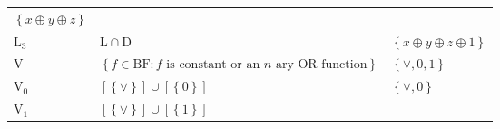 \documentclass[10pt,a4paper]{article}
\newcommand{\set}[1]{\left\{#1\right\}}
\newcommand{\xor}{\oplus}
\newcommand{\clonefont}[1]{\mathrm{#1}}
\begin{document}
\begin{figure}[hbtp]
\begin{small}
\begin{longtable}[]{p{}p{}p{}}
\begin{minipage}[t]{0.38\columnwidth}
                \(\set{x \xor y \xor z}\)\strut
            \end{minipage}\tabularnewline
            \begin{minipage}[t]{0.12\columnwidth}\raggedright
                \(\clonefont{L_3}\)\strut
            \end{minipage} & \begin{minipage}[t]{0.41\columnwidth}\raggedright
                \(\clonefont{L} \cap \clonefont{D}\)\strut
            \end{minipage} & \begin{minipage}[t]{0.38\columnwidth}\raggedright
                \(\set{x \xor y \xor z \xor 1}\)\strut
            \end{minipage}\tabularnewline
            \begin{minipage}[t]{0.12\columnwidth}\raggedright
                \(\clonefont{V}\)\strut
            \end{minipage} & \begin{minipage}[t]{0.41\columnwidth}\raggedright
                \(\set{f \in \clonefont{BF} : f \text{ is constant or an $n$-ary OR function}}\)\strut
            \end{minipage} & \begin{minipage}[t]{0.38\columnwidth}\raggedright
                \(\set{\lor,0,1}\)\strut
            \end{minipage}\tabularnewline
            \begin{minipage}[t]{0.12\columnwidth}\raggedright
                \(\clonefont{V_0}\)\strut
            \end{minipage} & \begin{minipage}[t]{0.41\columnwidth}\raggedright
                \([\set{\lor}] \cup [\set{0}]\)\strut
            \end{minipage} & \begin{minipage}[t]{0.38\columnwidth}\raggedright
                \(\set{\lor,0}\)\strut
            \end{minipage}\tabularnewline
            \begin{minipage}[t]{0.12\columnwidth}\raggedright
                \(\clonefont{V_1}\)\strut
            \end{minipage} & \begin{minipage}[t]{0.41\columnwidth}\raggedright
                \([\set{\lor}] \cup [\set{1}]\)\strut
            \end{minipage} & \begin{minipage}[t]{0.38\columnwidth}\raggedright

\end{minipage}
\end{longtable}
\end{small}
\end{figure}
\end{document}
